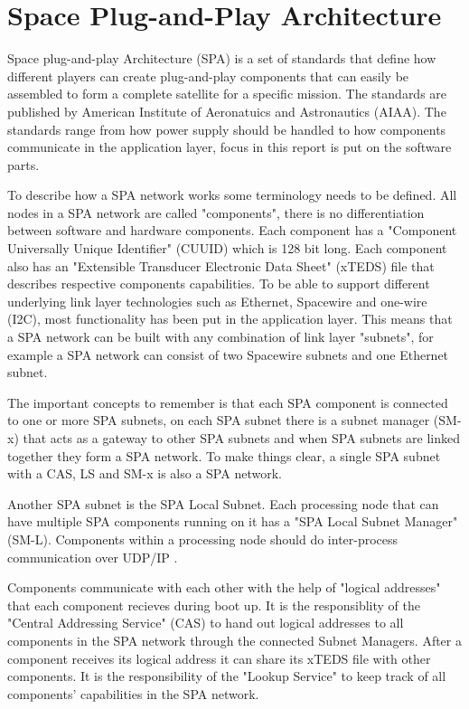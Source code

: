 \chapter{Space Plug-and-Play Architecture}\label{ch:spa}
Space plug-and-play Architecture (SPA) is a set of standards that define how
different players can create plug-and-play components that can easily be
assembled to form a complete satellite for a specific mission. The standards
are published by American Institute of Aeronatuics and Astronautics (AIAA). The
standards range from how power supply should be handled to how components
communicate in the application layer, focus in this report is put on the
software parts.

To describe how a SPA network works some terminology needs to be defined. All
nodes in a SPA network are called "components", there is no differentiation
between software and hardware components. Each component has a "Component
Universally Unique Identifier" (CUUID) which is 128 bit long. Each component
also has an "Extensible Transducer Electronic Data Sheet" (xTEDS) file that
describes respective components capabilities. To be able to support different
underlying link layer technologies such as Ethernet, Spacewire and one-wire
(I2C), most functionality has been put in the application layer. This means
that a SPA network can be built with any combination of link layer "subnets",
for example a SPA network can consist of two Spacewire subnets and one Ethernet
subnet.


The important concepts to remember is that each SPA component is
connected to one or more SPA subnets, on each SPA subnet there is a subnet
manager (SM-x) that acts as a gateway to other SPA subnets and when SPA subnets
are linked together they form a SPA network. To make things clear, a single SPA
subnet with a CAS, LS and SM-x is also a SPA network.

Another SPA subnet is the SPA Local Subnet. Each processing node that can
have multiple SPA components running on it has a "SPA Local Subnet Manager"
(SM-L).  Components within a processing node should do inter-process
communication over UDP/IP \cite{spa:local-subnet}.

Components communicate with each other with the help of "logical addresses"
that each component recieves during boot up. It is the responsiblity of the
"Central Addressing Service" (CAS) to hand out logical addresses to all
components in the SPA network through the connected Subnet Managers. After a
component receives its logical address it can share its xTEDS file with other
components. It is the responsibility of the "Lookup Service" to keep track of
all components' capabilities in the SPA network.


